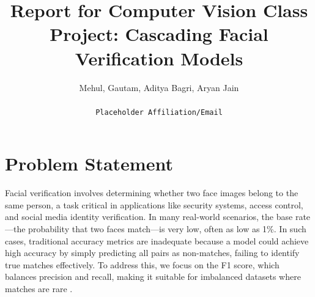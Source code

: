 \documentclass[times,10pt,twocolumn]{article}
\begin{document}
\title{Report for Computer Vision Class Project: Cascading Facial Verification Models}

\author{Mehul, Gautam, Aditya Bagri, Aryan Jain\\\\
{\tt\small Placeholder Affiliation/Email}
}

\maketitle
\thispagestyle{empty} %


\section{Problem Statement}
Facial verification involves determining whether two face images belong to the same person, a task critical in applications like security systems, access control, and social media identity verification. In many real-world scenarios, the base rate—the probability that two faces match—is very low, often as low as 1\%. In such cases, traditional accuracy metrics are inadequate because a model could achieve high accuracy by simply predicting all pairs as non-matches, failing to identify true matches effectively. To address this, we focus on the F1 score, which balances precision and recall, making it suitable for imbalanced datasets where matches are rare \cite{imbalancedlearning}.
\end{document}
